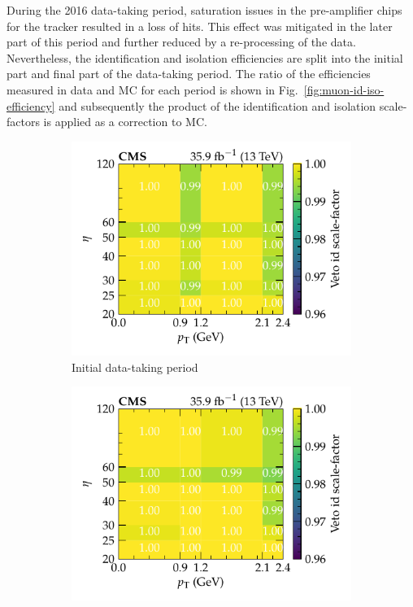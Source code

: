 During the 2016 data-taking period, saturation issues in the pre-amplifier
chips for the tracker resulted in a loss of hits. This effect was mitigated in
the later part of this period and further reduced by a re-processing of the
data. Nevertheless, the identification and isolation efficiencies are split
into the initial part and final part of the data-taking period. The ratio of
the efficiencies measured in data and MC for each period is shown in
Fig.~\ref{fig:muon-id-iso-efficiency} and subsequently the product of the
identification and isolation scale-factors is applied as a correction to MC.

\begin{figure}[htbp]
    \centering
    \begin{subfigure}[b]{0.49\textwidth}
        \centering
        \includegraphics{chapters/041_corrections/images/efficiencies/objects/muons/muon_id_loose_runbf.pdf}
        \caption{Initial data-taking period}
        \label{subfiga:muon-id-scale-factors}
    \end{subfigure}
    \begin{subfigure}[b]{0.49\textwidth}
        \centering
        \includegraphics{chapters/041_corrections/images/efficiencies/objects/muons/muon_id_loose_rungh.pdf}

\end{subfigure}
\end{figure}
